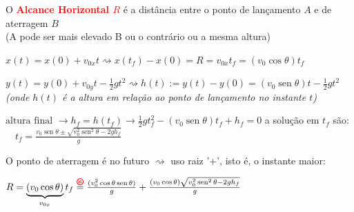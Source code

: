 \documentclass{beamer}
\begin{document}
	
	\providecommand{\circled}[1]{\mbox{\tikz[baseline=(char.base)]{\node[shape=circle,draw=red,thick,inner sep=0.5pt,text=red,font=\tiny\bfseries] (char) {#1};}}}
	
	\begin{frame}
		\scriptsize %
		
		O \textcolor{red}{\textbf{Alcance Horizontal $R$}} é a distância entre o ponto de lançamento $A$ e de aterragem $B$ \\
		(A pode ser mais elevado B ou o contrário ou a mesma altura)
		
		\vspace{0.2cm}
		\begin{minipage}[t]{0.75\textwidth}
			\vspace{0pt}
			$x(t) = x(0) + v_{0x}t \rightsquigarrow x(t_f) - x(0) = R = v_{0x}t_f = (v_0\cos\theta)t_f$
			
			\vspace{0.1cm}
			$y(t) = y(0) + v_{0y}t - \frac{1}{2}gt^2 \rightsquigarrow h(t) := y(t) - y(0) = (v_0\operatorname{sen}\theta)t - \frac{1}{2}gt^2$ \\
			\textit{\tiny (onde $h(t)$ é a altura em relação ao ponto de lançamento no instante $t$)}
			
			\vspace{0.3cm}
			$\text{altura final } \rightarrow h_f = h(t_f) \rightarrow \frac{1}{2}gt_f^2 - (v_0\operatorname{sen}\theta)t_f + h_f = 0$ 
			a solução em $t_f$ são: $\quad t_f = \frac{v_0\operatorname{sen}\theta \pm \sqrt{v_0^2\operatorname{sen}^2\theta - 2gh_f}}{g}$
			
			\vspace{0.3cm}
			O ponto de aterragem é no futuro $\rightsquigarrow$ uso raiz '+', isto é, o instante maior: 
			
			\vspace{0.3cm}
			$R = \underbrace{(v_0\cos\theta)}_{v_{0x}} \tikz[remember picture, baseline=(tftarget.base)]{\node[inner sep=0pt] (tftarget) {$t_f$};} \overset{\circled{6}}{=} \frac{(v_0^2\cos\theta\operatorname{sen}\theta)}{g} + \frac{(v_0\cos\theta)\sqrt{v_0^2\operatorname{sen}^2\theta - 2gh_f}}{g}$
			

\end{minipage}
\end{frame}
\end{document}
